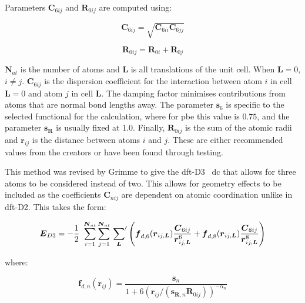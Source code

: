 Parameters \( \boldsymbol{C}_{6ij} \) and \( \boldsymbol{R}_{0ij} \) are computed using:

\begin{equation}
\boldsymbol{C}_{6ij} = \sqrt{\boldsymbol{C}_{6ii} \boldsymbol{C}_{6jj}} 
\end{equation}

\begin{equation}
\boldsymbol{R}_{0ij} = \boldsymbol{R}_{0i} + \boldsymbol{R}_{0j} 
\end{equation}

\(\boldsymbol{N}_{at}\) is the number of atoms and \(\boldsymbol{L}\) is all translations of the unit cell. When \(\boldsymbol{L} = 0\), \(i \neq j\). \(\boldsymbol{C}_{6ij}\) is the dispersion coefficient for the interaction between atom \(i\) in cell \(\boldsymbol{L} = 0\) and atom \(j\) in cell \(\boldsymbol{L}\). The damping factor minimises contributions from atoms that are normal bond lengths away. The parameter \(\boldsymbol{s}_6\) is specific to the selected functional for the calculation, where for \acrshort{pbe} this value is \(0.75\), and  the parameter \(\boldsymbol{s}_{\boldsymbol{R}}\) is usually fixed at \(1.0\). Finally, \(\boldsymbol{R}_{0ij}\) is the sum of the atomic radii and \(\boldsymbol{r}_{ij}\) is the distance between atoms \(i\) and \(j\). These are either recommended values from the creators or have been found through testing.

This method was revised by Grimme to give the \acrshort{dft}\nobreakdash-D3~\cite{Grimme2010} \acrshort{dc} that allows for three atoms to be considered instead of two. This allows for geometry effects to be included as the coefficients \(\boldsymbol{C}_{nij}\) are dependent on atomic coordination unlike in \acrshort{dft}\nobreakdash-D2. This takes the form:

\begin{equation}
\boldsymbol{E}_{D3} = -\frac{1}{2}\ \sum_{i=1}^{\boldsymbol{N}_{at}} \sum_{j=1}^{\boldsymbol{N}_{at}} \sideset{}{'}\sum_{\boldsymbol{L}} \left(\boldsymbol{f}_{d,6} (\boldsymbol{r}_{ij, \boldsymbol{L}}) \frac{\boldsymbol{C}_{6ij}} {\boldsymbol{r}_{ij,\boldsymbol{L}}^6} + \boldsymbol{f}_{d,8} (\boldsymbol{r}_{ij, \boldsymbol{L}}) \frac{\boldsymbol{C}_{8ij}} {\boldsymbol{r}_{ij,\boldsymbol{L}}^8}\right)
\end{equation}

where:

\begin{equation}
\boldsymbol{f}_{d,n}(\boldsymbol{r}_{ij}) = \frac{\boldsymbol{s}_n}{1 + 6 (\boldsymbol{r}_{ij} / (\boldsymbol{s}_{\boldsymbol{R},n} \boldsymbol{R}_{0ij}))^{-{\alpha}_{n}}} 
\end{equation}

